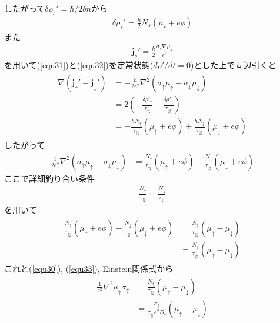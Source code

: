 \documentclass[uplatex,a4j,11pt,dvipdfmx]{jsarticle}
\begin{document}
したがって$\delta\rho_s'=\hbar/2\delta n$から
\begin{align}
  \delta\rho_s'=\frac{\hbar}{2}N_s(\mu_s+e\phi)
\end{align}
また
\begin{align}
  {\bm j}_s'=\frac{\hbar}{2}\frac{\sigma_s\nabla\mu_s}{e^2}
\end{align}
を用いて(\ref{equ31})と(\ref{equ32})を定常状態($d\rho'/dt=0$)とした上で両辺引くと
\begin{align}
  \begin{split}
    \nabla({\bm j}_\uparrow'-{\bm j}_\downarrow')&=-\frac{\hbar}{2e^2}\nabla^2(\sigma_\uparrow\mu_\uparrow-\sigma_\downarrow\mu_\downarrow)\\
    &=2\left(-\frac{\delta\rho'_\uparrow}{\tau_\updownarrows}+\frac{\delta\rho'_\downarrow}{\tau_\downuparrows}\right)\\
    &=-\frac{\hbar N_\uparrow}{\tau_\updownarrows}(\mu_\uparrow+e\phi)+\frac{\hbar N_\downarrow}{\tau_\downuparrows}(\mu_\downarrow+e\phi)
  \end{split}
\end{align}
したがって
\begin{align}
  \label{equ33}
  \frac{1}{2e^2}\nabla^2(\sigma_\uparrow\mu_\uparrow-\sigma_\downarrow\mu_\downarrow)&=\frac{N_\uparrow}{\tau_\updownarrows}(\mu_\uparrow+e\phi)-\frac{N_\downarrow}{\tau_\downuparrows}(\mu_\downarrow+e\phi)
\end{align}
ここで詳細釣り合い条件
\begin{align}
  \frac{N_\uparrow}{\tau_\updownarrows}=\frac{N_\downarrow}{\tau_\downuparrows}
\end{align}
を用いて
\begin{align}
  \begin{split}
    \frac{N_\uparrow}{\tau_\updownarrows}(\mu_\uparrow+e\phi)-\frac{N_\downarrow}{\tau_\downuparrows}(\mu_\downarrow+e\phi)&=\frac{N_\uparrow}{\tau_\updownarrows}(\mu_\uparrow-\mu_\downarrow)\\
    &=\frac{N_\downarrow}{\tau_\downuparrows}(\mu_\uparrow-\mu_\downarrow)
  \end{split}
\end{align}
これと(\ref{equ30}), (\ref{equ33}), Einstein関係式から
\begin{align}
  \begin{split}
    \frac{1}{e^2}\nabla^2\mu_\uparrow\sigma_\uparrow&=\frac{N_\uparrow}{\tau_\updownarrows}(\mu_\uparrow-\mu_\downarrow)\\
    &=\frac{\sigma_\uparrow}{\tau_\updownarrows e^2D_\uparrow}(\mu_\uparrow-\mu_\downarrow)
  \end{split}
\end{align}
\end{document}
